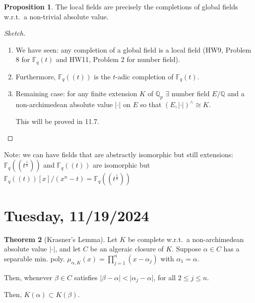 \documentclass[openany]{amsbook}
\numberwithin{section}{chapter}
\theoremstyle{definition}
\newtheorem{theorem}{Theorem}[chapter]
\newtheorem{proposition}[theorem]{Proposition}
\begin{document}
\begin{proposition}
    The local fields are precisely the completions of global fields w.r.t.\ a non-trivial absolute value.
\end{proposition}

\begin{proof}
    [Sketch]

    \begin{enumerate}[label=\arabic*)]
        \item We have seen: any completion of a global field is a local field (HW9, Problem 8 for \(\mathbb{F}_q(t)\) and HW11, Problem 2 for number field).
        \item Furthermore, \(\mathbb{F}_q((t))\) is the \(t\)-adic completion of \(\mathbb{F}_q(t)\). 
        \item Remaining case: for any finite extension \(K\) of \(\mathbb{Q}_p\) \(\exists\) number field \(E /\mathbb{Q}\) and a non-archimedean absolute value \(\vert \cdot \vert\) on \(E\) so that \((E,\vert \cdot \vert)^\wedge \cong K\). 
        
        This will be proved in 11.7.
    \end{enumerate} 
\end{proof}

Note: we can have fields that are abstractly isomorphic but still extensions: \(\mathbb{F}_q((t^{\frac{1}{n}}))\) and \(\mathbb{F}_q((t))\) are isomorphic but \(\mathbb{F}_q((t))[x] / (x^n - t) = \mathbb{F}_q((t^{\frac{1}{n}}))\)  

\section*{Tuesday, 11/19/2024}

\begin{theorem}
    [Krasner's Lemma]

    Let \(K\) be complete w.r.t.\ a non-archimedean absolute value \(\vert \cdot \vert\), and let \(C\) be an algeraic closure of \(K\). Suppose \(\alpha \in C\) has a separable min. poly. \(\mu_{\alpha ,K}(x) = \prod_{j=1}^n (x - \alpha_j)\) with \(\alpha_1 = \alpha\).
    
    Then, whenever \(\beta \in C\) satisfies \(\vert \beta - \alpha \vert < \vert \alpha_j - \alpha \vert\), for all \(2 \leq j \leq n\).

    Then, \(K(\alpha) \subset K(\beta)\).
\end{theorem}
\end{document}
